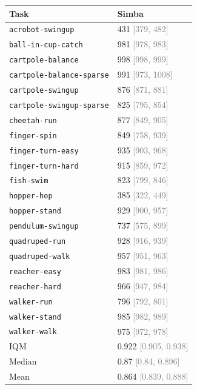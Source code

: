\begin{tabular}{ll}
\toprule
Task & Simba \\
\midrule
\texttt{acrobot-swingup} & 431 \textcolor{gray}{[379, 482]} \\
\texttt{ball-in-cup-catch} & 981 \textcolor{gray}{[978, 983]} \\
\texttt{cartpole-balance} & 998 \textcolor{gray}{[998, 999]} \\
\texttt{cartpole-balance-sparse} & 991 \textcolor{gray}{[973, 1008]} \\
\texttt{cartpole-swingup} & 876 \textcolor{gray}{[871, 881]} \\
\texttt{cartpole-swingup-sparse} & 825 \textcolor{gray}{[795, 854]} \\
\texttt{cheetah-run} & 877 \textcolor{gray}{[849, 905]} \\
\texttt{finger-spin} & 849 \textcolor{gray}{[758, 939]} \\
\texttt{finger-turn-easy} & 935 \textcolor{gray}{[903, 968]} \\
\texttt{finger-turn-hard} & 915 \textcolor{gray}{[859, 972]} \\
\texttt{fish-swim} & 823 \textcolor{gray}{[799, 846]} \\
\texttt{hopper-hop} & 385 \textcolor{gray}{[322, 449]} \\
\texttt{hopper-stand} & 929 \textcolor{gray}{[900, 957]} \\
\texttt{pendulum-swingup} & 737 \textcolor{gray}{[575, 899]} \\
\texttt{quadruped-run} & 928 \textcolor{gray}{[916, 939]} \\
\texttt{quadruped-walk} & 957 \textcolor{gray}{[951, 963]} \\
\texttt{reacher-easy} & 983 \textcolor{gray}{[981, 986]} \\
\texttt{reacher-hard} & 966 \textcolor{gray}{[947, 984]} \\
\texttt{walker-run} & 796 \textcolor{gray}{[792, 801]} \\
\texttt{walker-stand} & 985 \textcolor{gray}{[982, 989]} \\
\texttt{walker-walk} & 975 \textcolor{gray}{[972, 978]} \\
IQM & 0.922 \textcolor{gray}{[0.905, 0.938]} \\
Median & 0.87 \textcolor{gray}{[0.84, 0.896]} \\
Mean & 0.864 \textcolor{gray}{[0.839, 0.888]} \\
\bottomrule
\end{tabular}
